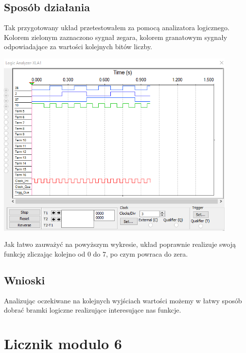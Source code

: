 \documentclass{article}
\begin{document}
        \subsection{Sposób działania}
            Tak przygotowany układ przetestowałem za pomocą analizatora logicznego. Kolorem zielonym zaznaczono sygnał zegara, kolorem granatowym sygnały odpowiadające za wartości kolejnych bitów liczby. 
            \begin{center}
                \includegraphics[width=12cm]{reports/img/Z3C_2.png}\\
            \end{center}
            Jak łatwo zauważyć na powyższym wykresie, układ poprawnie realizuje swoją funkcję zliczając kolejno od 0 do 7, po czym powraca do zera. 
        
        \subsection{Wnioski}
            Analizując oczekiwane na kolejnych wyjściach wartości możemy w łatwy sposób dobrać bramki logiczne realizujące interesujące nas funkcje. 
            
    \section{Licznik modulo 6}
\end{document}
